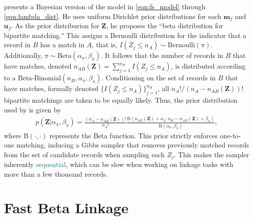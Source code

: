 \documentclass[ba]{imsart}
\begin{document}
\cite{sadinle_bayesian_2017} presents a Bayesian version of the model in \eqref{eqn:fs_model} through \eqref{eqn:lambda_dist}.  He uses uniform Dirichlet prior distributions for each $\bm{m}_f$ and $\bm{u}_f$.  As the prior distriburion for  $\bm{Z}$, he proposes the ``beta distribution for bipartite matching."  This assigns a Bernoulli distribution for the indicator that a record in $B$ has a match in $A$, that is, $I(Z_j \leq n_A) \sim \text{Bernoulli}(\pi)$.  Additionally, $\pi \sim \text{Beta}(\alpha_{\pi}, \beta_{\pi})$. It follows that the number of records in $B$ that have matches, denoted $n_{AB}(\bm{Z}) = \sum_{j=1}^{n_B} I(Z_j \leq n_A)$, is distributed according to a $\text{Beta-Binomial}(n_B, \alpha_{\pi}, \beta_{\pi})$. Conditioning on the set of records in $B$ that have matches, formally denoted $\{I(Z_j \leq n_A)\}_{j=1}^{n_B}$, all $n_A ! / (n_A - n_{AB}(\bm{Z}))!$ bipartite matchings are taken to be equally likely. Thus, the prior distribution used by \cite{sadinle_bayesian_2017} is given by
\begin{align}
\label{eqn:sadinle_prior}
p(\bm{Z}|\alpha_{\pi}, \beta_{\pi}) = \frac{(n_A - n_{AB}(\bm{Z}))!}{n_A !}\frac{\text{B}(n_{AB}(\bm{Z}) + \alpha_{\pi}, n_B - n_{AB}(\bm{Z}) + \beta_{\pi})}{\text{B}(\alpha_{\pi}, \beta_{\pi})},
\end{align}
where $\text{B}(\cdot, \cdot)$ represents the Beta function. This prior strictly enforces one-to-one matching, inducing a Gibbs sampler that removes previously matched records from the set of candidate records when sampling each $Z_j$. This makes the sampler inherently \textcolor{teal}{sequential}, which can be slow when working on linkage tasks with more than a few thousand records. 


\section{Fast Beta Linkage}
\label{sec:fast-beta-linkage}
\end{document}
